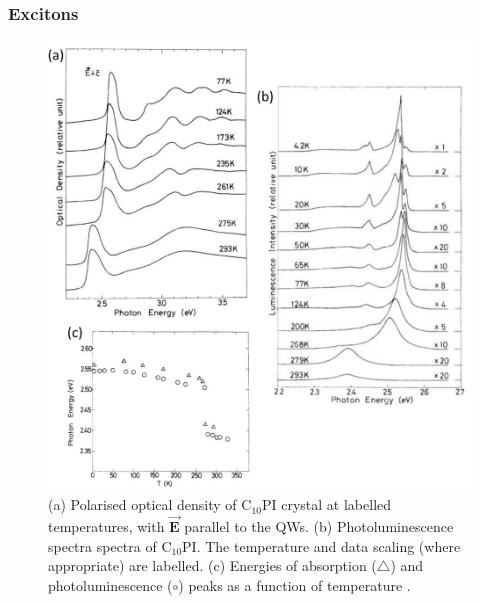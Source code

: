\subsubsection{Excitons}
\begin{figure}[h!]
\centering
\includegraphics[width=\textwidth]{Fig13}
\caption{(a) Polarised optical density of $\textrm{C}_{10}$PI crystal at labelled temperatures, with $\vec{\mathbf{E}}$ parallel to the QWs. (b) Photoluminescence spectra spectra of $\textrm{C}_{10}$PI. The temperature and data scaling (where appropriate) are labelled. (c) Energies of absorption ($\triangle$) and photoluminescence ($\circ$) peaks as a function of temperature \cite{Ishihara1990}.}
\label{2Fig13}
\end{figure}
